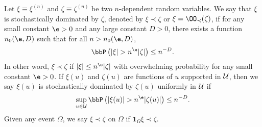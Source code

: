 \documentclass[aos,preprint]{imsart}
\begin{document}
\begin{definition}\label{stoch_domination}
Let $\xi\equiv \xi^{(n)}$ and $\zeta\equiv \zeta^{(n)}$ be two $n$-dependent random variables.
We say that $\xi$ is stochastically dominated by $\zeta$, denoted by $\xi\prec \zeta$ or $\xi=\OO_\prec(\zeta)$, if for any small constant $\e > 0$ and any large constant $D > 0$, there exists a function $n_0(\e, D)$ such that for all $n > n_0(\e, D)$,
\[ \bbP\left(|\xi| >n^\e |\zeta|\right)\le n^{-D}. \]
In other word, $\xi\prec \zeta$ if $|\xi| \le n^\e |\zeta|$ with overwhelming probability for any small constant $\e>0$. If $\xi(u)$ and $\zeta(u)$ are functions of $u$ supported in $\cal U$, then we say $\xi(u)$ is stochastically dominated by $\zeta(u)$ uniformly in $\cal U$ if %
\[ \sup_{u\in \cal U}\bbP\left(|\xi(u)|>n^\e |\zeta(u)|\right)\le n^{-D}. \]
Given any event $\Omega$, we say $\xi \prec \zeta$ on $\Omega$ if $\mathbf 1_{\Omega}\xi \prec \zeta$.
\end{definition}


%
\end{document}
